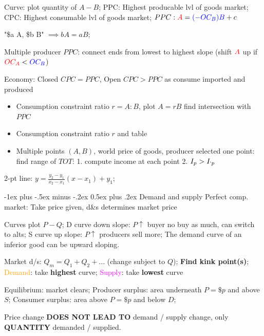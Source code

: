\documentclass[a4paper]{article}
\makeatletter
\renewcommand{\section}{\@startsection{section}{1}{0mm}%
                                {-1ex plus -.5ex minus -.2ex}%
                                {0.5ex plus .2ex}%
                                {\normalfont\large\bfseries}}
\makeatother
\begin{document}
\begin{multicols*}{3}
    Curve: plot quantity of $A-B$; PPC: Highest producable lvl of goods market; CPC: Highest consumable lvl of goods market; $PPC: \textcolor{red}{A} = \textcolor{blue}{(-OC_B)B}+c$

    "\$a A, \$b B" $\implies bA=aB$;

    Multiple producer $PPC$: connect ends from lowest to highest slope (shift $\textcolor{red}{A}$ up if $\textcolor{red}{OC_A}<\textcolor{blue}{OC_B}$)

    Economy: Closed $CPC=PPC$, Open $CPC > PPC$ as consume imported and produced

    \begin{itemize}
        \item Consumption constraint ratio $r=A:B$, plot $A=rB$ find intersection with $PPC$
        \item Consumption constraint ratio $r$ and table
        \item Multiple points $(A,B)$, world price of goods, producer selected one point: find range of $TOT$: 1. compute income at each point 2. $I_p > I_{`p}$
    \end{itemize}

    2-pt line: $y=\frac{y_2-y_1}{x_2-x_1}(x-x_1)+y_1$;

    \section{Demand and supply}
    Perfect comp. market: Take price given, d\&s determines market price

    Curves plot $P-Q$; D curve down slope: $P\uparrow$ buyer no buy as much, can switch to alts; S curve up slope: $P\uparrow$ producers sell more; The demand curve of an inferior good can be upward sloping.

    Market d/s: $Q_m = Q_1 + Q_2 + \ldots$ (change subject to $Q$); \textbf{Find kink point(s)}; \textcolor{orange}{Demand}: take \textbf{highest} curve; \textcolor{magenta}{Supply}: take \textbf{lowest} curve

    Equilibrium: market clears; Producer surplus: area underneath $P=\$p$ and above $S$; Consumer surplus: area above $P=\$p$ and below $D$;

    Price change \textbf{DOES NOT LEAD TO} demand / supply change, only \textbf{QUANTITY} demanded / supplied.


\end{multicols*}
\end{document}
